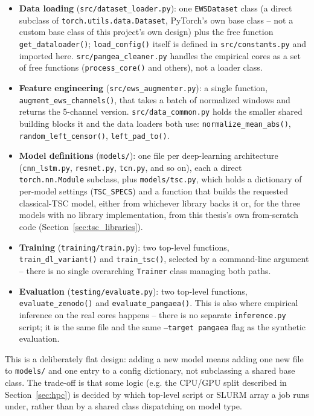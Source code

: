 \begin{itemize}
    \item \textbf{Data loading} (\texttt{src/dataset\_loader.py}): one \texttt{EWSDataset} class (a direct subclass of \texttt{torch.utils.data.Dataset}, PyTorch's own base class -- not a custom base class of this project's own design) plus the free function \texttt{get\_dataloader()}; \texttt{load\_config()} itself is defined in \texttt{src/constants.py} and imported here. \texttt{src/pangea\_cleaner.py} handles the empirical cores as a set of free functions (\texttt{process\_core()} and others), not a loader class.
    \item \textbf{Feature engineering} (\texttt{src/ews\_augmenter.py}): a single function, \texttt{augment\_ews\_channels()}, that takes a batch of normalized windows and returns the 5-channel version. \texttt{src/data\_common.py} holds the smaller shared building blocks it and the data loaders both use: \texttt{normalize\_mean\_abs()}, \texttt{random\_left\_censor()}, \texttt{left\_pad\_to()}.
    \item \textbf{Model definitions} (\texttt{models/}): one file per deep-learning architecture (\texttt{cnn\_lstm.py}, \texttt{resnet.py}, \texttt{tcn.py}, and so on), each a direct \texttt{torch.nn.Module} subclass, plus \texttt{models/tsc.py}, which holds a dictionary of per-model settings (\texttt{TSC\_SPECS}) and a function that builds the requested classical-TSC model, either from whichever library backs it or, for the three models with no library implementation, from this thesis's own from-scratch code (Section~\ref{sec:tsc_libraries}).
    \item \textbf{Training} (\texttt{training/train.py}): two top-level functions, \texttt{train\_dl\_variant()} and \texttt{train\_tsc()}, selected by a command-line argument -- there is no single overarching \texttt{Trainer} class managing both paths.
    \item \textbf{Evaluation} (\texttt{testing/evaluate.py}): two top-level functions, \texttt{evaluate\_zenodo()} and \texttt{evaluate\_pangaea()}. This is also where empirical inference on the real cores happens -- there is no separate \texttt{inference.py} script; it is the same file and the same \texttt{--target pangaea} flag as the synthetic evaluation.
\end{itemize}

This is a deliberately flat design: adding a new model means adding one new file to \texttt{models/} and one entry to a config dictionary, not subclassing a shared base class. The trade-off is that some logic (e.g. the CPU/GPU split described in Section~\ref{sec:hpc}) is decided by which top-level script or SLURM array a job runs under, rather than by a shared class dispatching on model type.

